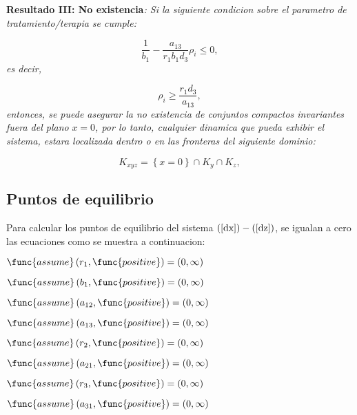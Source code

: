 \documentclass[letterpaper,11pt]{article}
\begin{document}
\bigskip

\textbf{Resultado III: No existencia}\textit{: Si la siguiente condicion
sobre el parametro de tratamiento/terapia se cumple:}

\begin{equation*}
\frac{1}{b_{1}}-\frac{a_{13}}{r_{1}b_{1}d_{3}}\rho _{i}\leq 0,
\end{equation*}%
\textit{es decir,}

\bigskip 
\begin{equation*}
\rho _{i}\geq \frac{r_{1}d_{3}}{a_{13}},
\end{equation*}%
\textit{entonces, se puede asegurar la no existencia de conjuntos compactos
invariantes fuera del plano }$x=0$\textit{, por lo tanto, cualquier dinamica
que pueda exhibir el sistema, estara localizada dentro o en las fronteras
del siguiente dominio:}

\begin{equation*}
K_{xyz}=\left\{ x=0\right\} \cap K_{y}\cap K_{z},
\end{equation*}

\subsection{Puntos de equilibrio}

Para calcular los puntos de equilibrio del sistema $\left( \ref{dx}\right)
-\left( \ref{dz}\right) $, se igualan a cero las ecuaciones como se muestra
a continuacion:

$\func{assume}\left( r_{1},\func{positive}\right) =\allowbreak \left(
0,\infty \right) $

$\func{assume}\left( b_{1},\func{positive}\right) =\allowbreak \left(
0,\infty \right) $

$\func{assume}\left( a_{12},\func{positive}\right) =\allowbreak \left(
0,\infty \right) $

$\func{assume}\left( a_{13},\func{positive}\right) =\allowbreak \left(
0,\infty \right) $

$\func{assume}\left( r_{2},\func{positive}\right) =\allowbreak \left(
0,\infty \right) $

$\func{assume}\left( a_{21},\func{positive}\right) =\allowbreak \left(
0,\infty \right) $

$\func{assume}\left( r_{3},\func{positive}\right) =\allowbreak \left(
0,\infty \right) $

$\func{assume}\left( a_{31},\func{positive}\right) =\allowbreak \left(
0,\infty \right) $
\end{document}

